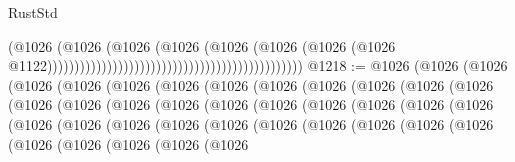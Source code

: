 \begin{lexlean}{RustStd}
\begin{coremodule}
                                                                                  (@1026
                                                                                    (@1026
                                                                                      (@1026
                                                                                        (@1026
                                                                                          (@1026
                                                                                            (@1026
                                                                                              (@1026
                                                                                                (@1026
                                                                                                  @1122)))))))))))))))))))))))))))))))))))))))))))))))
@1218 := @1026
    (@1026
      (@1026
        (@1026
          (@1026
            (@1026
              (@1026
                (@1026
                  (@1026
                    (@1026
                      (@1026
                        (@1026
                          (@1026
                            (@1026
                              (@1026
                                (@1026
                                  (@1026
                                    (@1026
                                      (@1026
                                        (@1026
                                          (@1026
                                            (@1026
                                              (@1026
                                                (@1026
                                                  (@1026
                                                    (@1026
                                                      (@1026
                                                        (@1026
                                                          (@1026
                                                            (@1026
                                                              (@1026
                                                                (@1026
                                                                  (@1026
                                                                    (@1026
                                                                      (@1026
                                                                        (@1026
                                                                          (@1026
                                                                            (@1026

\end{coremodule}
\end{lexlean}
